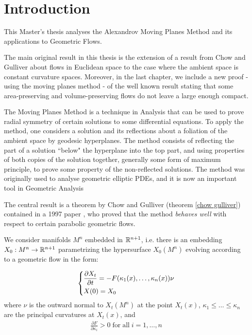 \chapter*{Introduction}

This Master's thesis analyses the Alexandrov Moving Planes Method and its applications to Geometric Flows. 

The main original result in this thesis is the extension of a result from Chow and Gulliver about flows in Euclidean space to  the case where the ambient space is constant curvature spaces. Moreover, in the last chapter, we include a new proof - using the moving planes method - of the well known result stating that some area-preserving and volume-preserving flows do not leave a large enough compact. 

The Moving Planes Method is a technique in Analysis that can be used to prove radial symmetry of certain solutions to some differential equations. To apply the method, one considers a solution and its reflections about a foliation of the ambient space by geodesic hyperplanes. The method consists of reflecting the part of a solution ``below" the hyperplane into the top part, and using properties of both copies of the solution together, generally some form of maximum principle, to prove some property of the non-reflected solutions. The method was originally used to analyse geometric elliptic PDEs, and it is now an important tool in Geometric Analysis

The central result is a theorem by Chow and Gulliver (theorem \ref{chow gulliver}) contained in a 1997 paper \cite{Chow}, who proved that the method \textit{behaves well} with respect to certain parabolic geometric flows. 


We consider manifolds $M^n$ embedded in $\mathbb{R}^{n+1}$, i.e. there is an embedding $X_0 : M^n \rightarrow \mathbb{R}^{n+1}$ parametrizing the hypersurface $X_0(M^n)$ evolving according to a geometric flow in the form: 

\begin{align*}
	\begin{dcases}
		\frac{\partial X_t}{\partial t} = - F(\kappa_1(x), \dots , \kappa_n(x)) \nu\\
		X(0)= X_0
	\end{dcases} 
\end{align*}
where $\nu$ is the outward normal to $X_t(M^n)$ at the point $X_t(x)$, $\kappa_1\leq \dots \leq \kappa_n$ are the principal curvatures at $X_t(x)$, and 
\begin{align*}
	\frac{\partial F}{\partial \kappa_i} > 0 \mathrm{\; for \; all } \; i=1,\dots, n
\end{align*}

